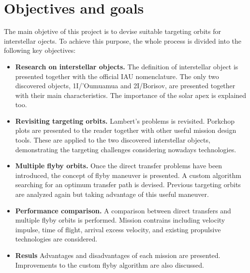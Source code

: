 \section{Objectives and goals}

The main objetive of this project is to devise suitable targeting orbits for
interstellar ojects. To achieve this purpose, the whole process is divided
into the following key objectives:

\begin{itemize}

    \item \textbf{Research on interstellar objects.}
        The definition of interstellar object is presented together with the
        official IAU nomenclature. The only two discovered objects,
        1I/'Oumuamua and 2I/Borisov, are presented together with their main
        characteristics. The importance of the solar apex is explained
        too.

    \item \textbf{Revisiting targeting orbits.}
        Lambert's problems is revisited. Porkchop plots are presented to the
        reader together with other useful mission design tools. These are
        applied to the two discovered interstellar objects, demonstrating the
        targeting challenges considering nowadays technologies.

    \item \textbf{Multiple flyby orbits.}
        Once the direct transfer problems have been introduced, the concept of
        flyby maneuver is presented. A custom algorithm searching for an
        optimum transfer path is devised. Previous targeting orbits are
        analyzed again but taking advantage of this useful maneuver.

   \item \textbf{Performance comparison.}
        A comparison between direct transfers and multiple flyby orbits is
        performed. Mission contrains including velocity impulse, time of
        flight, arrival excess velocity, and existing propulsive technologies 
        are considered.

   \item \textbf{Resuls}
        Advantages and disadvantages of each mission are presented. Improvements
        to the custom flyby algorithm are also discussed.
\end{itemize}
